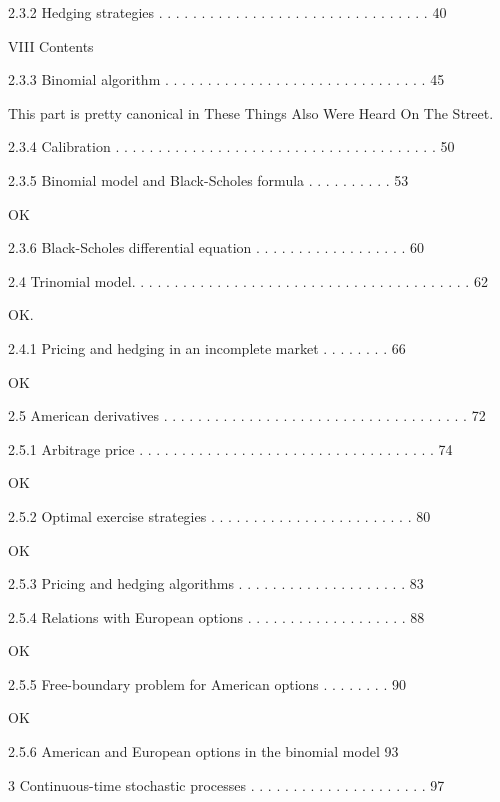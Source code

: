 2.3.2 Hedging strategies . . . . . . . . . . . . . . . . . . . . . . . . . . . . . . . . 40



VIII Contents



2.3.3 Binomial algorithm . . . . . . . . . . . . . . . . . . . . . . . . . . . . . . . 45

This part is pretty canonical in These Things Also Were Heard On The Street.

2.3.4 Calibration . . . . . . . . . . . . . . . . . . . . . . . . . . . . . . . . . . . . . . 50



2.3.5 Binomial model and Black-Scholes formula . . . . . . . . . . 53

OK

2.3.6 Black-Scholes differential equation . . . . . . . . . . . . . . . . . . 60



2.4 Trinomial model. . . . . . . . . . . . . . . . . . . . . . . . . . . . . . . . . . . . . . . . 62

OK.

2.4.1 Pricing and hedging in an incomplete market . . . . . . . . 66

OK

2.5 American derivatives . . . . . . . . . . . . . . . . . . . . . . . . . . . . . . . . . . . . 72



2.5.1 Arbitrage price . . . . . . . . . . . . . . . . . . . . . . . . . . . . . . . . . . . 74

OK

2.5.2 Optimal exercise strategies . . . . . . . . . . . . . . . . . . . . . . . . 80

OK

2.5.3 Pricing and hedging algorithms . . . . . . . . . . . . . . . . . . . . 83



2.5.4 Relations with European options . . . . . . . . . . . . . . . . . . . 88

OK

2.5.5 Free-boundary problem for American options . . . . . . . . 90

OK

2.5.6 American and European options in the binomial model 93



3 Continuous-time stochastic processes . . . . . . . . . . . . . . . . . . . . . 97


